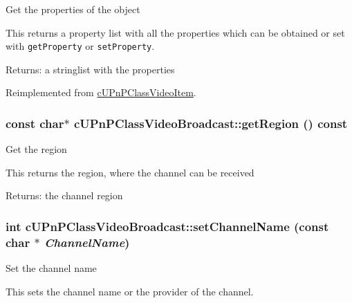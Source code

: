 Get the properties of the object

This returns a property list with all the properties which can be obtained or set with {\tt getProperty} or {\tt setProperty}.

\begin{Desc}
\item[Returns:]a stringlist with the properties \end{Desc}


Reimplemented from \hyperlink{classcUPnPClassVideoItem_9dc397419b45535a3e6a676667b619a4}{cUPnPClassVideoItem}.\hypertarget{classcUPnPClassVideoBroadcast_f4582c82588879c110947fdfc50b7895}{
\subsubsection[{getRegion}]{\setlength{\rightskip}{0pt plus 5cm}const char$\ast$ cUPnPClassVideoBroadcast::getRegion () const}}
\label{classcUPnPClassVideoBroadcast_f4582c82588879c110947fdfc50b7895}


Get the region

This returns the region, where the channel can be received

\begin{Desc}
\item[Returns:]the channel region \end{Desc}
\hypertarget{classcUPnPClassVideoBroadcast_b3d1740f8ad67cec1c82c23078b03189}{
\subsubsection[{setChannelName}]{\setlength{\rightskip}{0pt plus 5cm}int cUPnPClassVideoBroadcast::setChannelName (const char $\ast$ {\em ChannelName})}}
\label{classcUPnPClassVideoBroadcast_b3d1740f8ad67cec1c82c23078b03189}


Set the channel name

This sets the channel name or the provider of the channel.

